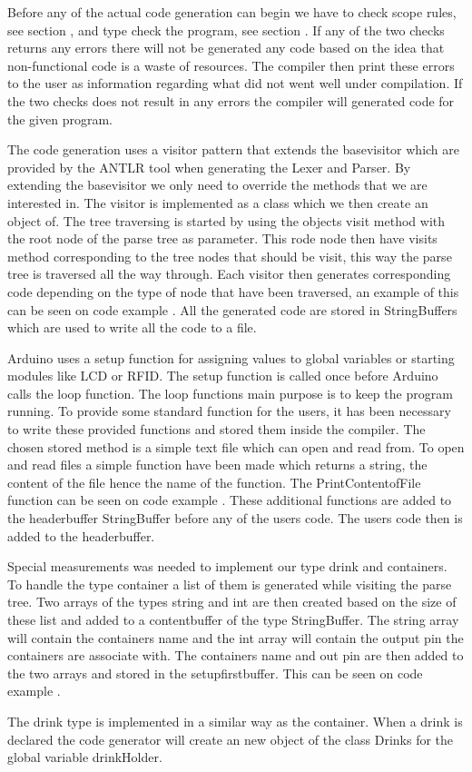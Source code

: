 Before any of the actual code generation can begin we have to check scope rules, see section , and type check the program, see section . If any of the two checks returns any errors there will not be generated any code based on the idea that non-functional code is a waste of resources. The compiler then print these errors to the user as information regarding what did not went well under compilation. If the two checks does not result in any errors the compiler will generated code for the given program.

The code generation uses a visitor pattern that extends the basevisitor which are provided by the ANTLR tool when generating the Lexer and Parser. By extending the basevisitor we only need to override the methods that we are interested in. The visitor is implemented as a class which we then create an object of. The tree traversing is started by using the objects visit method with the root node of the parse tree as parameter. This rode node then have visits method corresponding to the tree nodes that should be visit, this way the parse tree is traversed all the way through. Each visitor then generates corresponding code depending on the type of node that have been traversed, an example of this can be seen on code example . All the generated code are stored in StringBuffers which are used to write all the code to a file.

Arduino uses a setup function for assigning values to global variables or starting modules like LCD or RFID. The setup function is called once before Arduino calls the loop function. The loop functions main purpose is to keep the program running. To provide some standard function for the users, it has been necessary to write these provided functions and stored them inside the compiler. The chosen stored method is a simple text file which can open and read from. To open and read files a simple function have been made which returns a string, the content of the file hence the name of the function. The PrintContentofFile function can be seen on code example . These additional functions are added to the headerbuffer StringBuffer before any of the users code. The users code then is added to the headerbuffer.

Special measurements was needed to implement our type drink and containers. To handle the type container a list of them is generated while visiting the parse tree. Two arrays of the types string and int are then created based on the size of these list and added to a contentbuffer of the type StringBuffer. The string array will contain the containers name and the int array will contain the output pin the containers are associate with. The containers name and out pin are then added to the two arrays and stored in the setupfirstbuffer. This can be seen on code example .

The drink type is implemented in a similar way as the container. When a drink is declared the code generator will create an new object of the class Drinks for the global variable drinkHolder.
